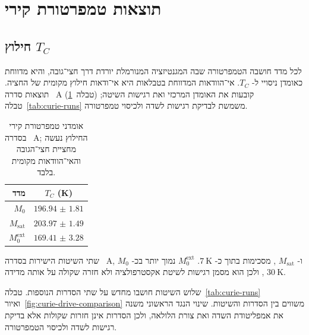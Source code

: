 \documentclass{extarticle}
\begin{document}
\section{תוצאות טמפרטורת קירי}

\subsection{חילוץ \texorpdfstring{$T_C$}{TC}}
לכל מדד חושבה הטמפרטורה שבה המגנטיזציה המנורמלת יורדת דרך חצי־גובה, והיא מדווחת כאומדן ניסויי ל-
$T_C$.
אי־הוודאות המדווחת בטבלאות היא אי־ודאות חילוץ מקומית של החציה. תוצאות סדרה~
\textenglish{A}
(טבלה~\ref{tab:curie-results}) קובעות את האומדן המרכזי ואת רגישות השיטה; טבלה~\ref{tab:curie-runs} משמשת לבדיקת רגישות לשדה ולכיסוי טמפרטורה.

\begin{table}[H]
\centering
\begin{tabular}{@{}rc@{}}
\toprule
מדד & $T_C$ (\si{\kelvin}) \\
\midrule
$M_{0}$ & $\num{196.94(181)}$ \\
$M_{\mathrm{sat}}$ & $\num{203.97(149)}$ \\
$M_{0}^{\mathrm{ext}}$ & $\num{169.41(328)}$ \\
\bottomrule
\end{tabular}
\caption{אומדני טמפרטורת קירי בסדרה~%
\textenglish{A};
החילוץ נעשה מחציית חצי־הגובה והאי־הוודאות מקומית בלבד.}
\label{tab:curie-results}
\end{table}

שתי השיטות הישירות בסדרה~
\textenglish{A},
$M_{0}$
ו-
$M_{\mathrm{sat}}$
, מסכימות בתוך כ-
$\SI{7}{\kelvin}$.
$M_{0}^{\mathrm{ext}}$
נמוך יותר בכ-
$\SI{30}{\kelvin}$
, ולכן הוא מסמן רגישות לשיטת אקסטרפולציה ולא חזרה שקולה על אותה מדידה.

שלוש השיטות חושבו מחדש על שתי הסדרות הנוספות. טבלה~\ref{tab:curie-runs} ואיור~\ref{fig:curie-drive-comparison} משווים בין הסדרות והשיטות. שינוי הנגד הראשוני משנה את אמפליטודת השדה ואת צורת הלולאה, ולכן הסדרות אינן חזרות שקולות אלא בדיקת רגישות לשדה ולכיסוי הטמפרטורה.
\end{document}
